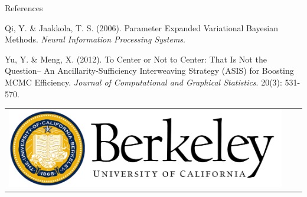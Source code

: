 \documentclass[final]{beamer}
\newlength{\onecolwid}
\begin{document}
\begin{frame}[t]
\begin{columns}[t]
\begin{column}{\onecolwid}
\begin{block}{References}
{\noindent[5] Qi, Y. \& Jaakkola, T. S. (2006). Parameter Expanded Variational Bayesian Methods. {\itshape Neural Information Processing Systems}. 

\noindent[6] Yu, Y. \& Meng, X. (2012). To Center or Not to Center: That Is Not the
Question-- An Ancillarity-Sufficiency Interweaving Strategy (ASIS) for Boosting MCMC Efficiency. {\itshape Journal of Computational and Graphical Statistics}. 20(3): 531-570. 

}

\end{block}




\vspace{15em} 

\begin{center}
\begin{tabular}{ccc}
\includegraphics[width=0.6\linewidth]{logo.png} %
\end{tabular}
\end{center}


\end{column} %

\end{columns} %

\end{frame} %
\end{document}
